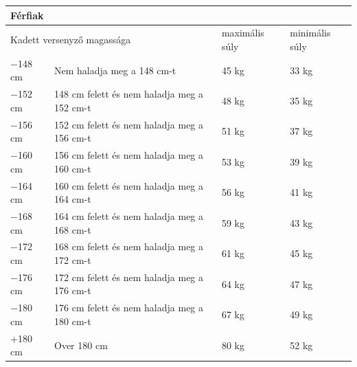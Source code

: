 \documentclass[]{report}
\begin{document}
\begin{enumerate}
\begin{enumerate}
\begin{samepage}
    \begin{center}
    \begin{tabular}{ |l|l|l|l| }
     \hline
     \multicolumn{4}{|l|}{Férfiak} \\
     \hline
     \multicolumn{2}{|l|}{Kadett versenyző magassága} & maximális súly & minimális súly\\
     \hline
     $-$148 cm & Nem haladja meg a 148 cm-t & 45 kg & 33 kg \\
     \hline
     $-$152 cm & 148 cm felett és nem haladja meg a 152 cm-t & 48 kg & 35 kg \\
     \hline
     $-$156 cm & 152 cm felett és nem haladja meg a 156 cm-t & 51 kg & 37 kg \\
     \hline
     $-$160 cm & 156 cm felett és nem haladja meg a 160 cm-t & 53 kg & 39 kg \\
     \hline
     $-$164 cm & 160 cm felett és nem haladja meg a 164 cm-t & 56 kg & 41 kg \\
     \hline
     $-$168 cm & 164 cm felett és nem haladja meg a 168 cm-t & 59 kg & 43 kg \\
     \hline
     $-$172 cm & 168 cm felett és nem haladja meg a 172 cm-t & 61 kg & 45 kg \\
     \hline
     $-$176 cm & 172 cm felett és nem haladja meg a 176 cm-t & 64 kg & 47 kg \\
     \hline
     $-$180 cm & 176 cm felett és nem haladja meg a 180 cm-t & 67 kg & 49 kg \\
     \hline
     +180 cm & Over 180 cm & 80 kg & 52 kg  \\
     \hline
    \end{tabular}
    \end{center}
    \end{samepage}


\end{enumerate}
\end{enumerate}
\end{document}
